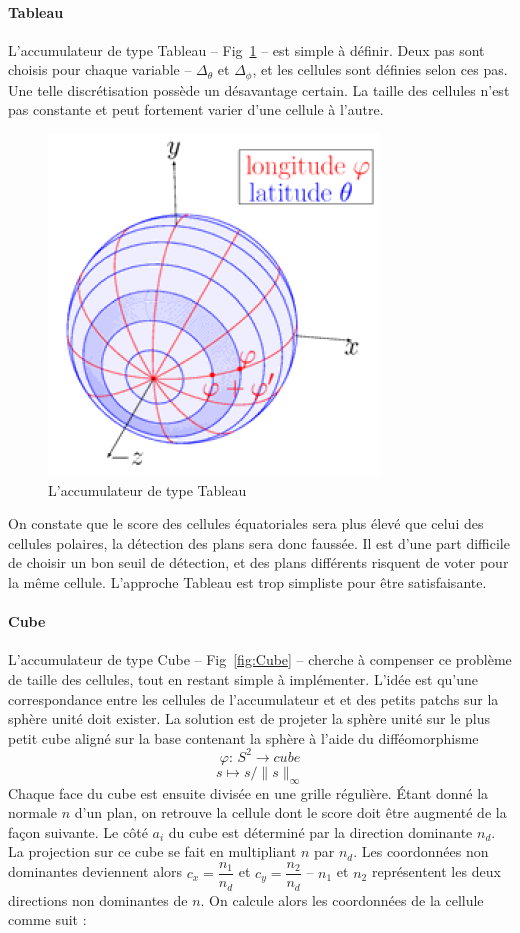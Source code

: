 \documentclass[12pt, twoside]{article}
\begin{document}
\paragraph{Tableau}
L’accumulateur de type Tableau -- Fig~\ref{fig:Array} -- est simple à définir. Deux pas sont choisis pour chaque variable -- $\Delta_{\theta}$ et $\Delta_{\phi}$, et les cellules sont définies selon ces pas. Une telle discrétisation possède un désavantage certain. La taille des cellules n’est pas constante et peut fortement varier d’une cellule à l’autre.

\begin{figure}[h]
\centering
\includegraphics[scale=0.65]{Array.png}
\caption{\label{fig:Array} L'accumulateur de type Tableau}
\end{figure}

On constate que le score des cellules équatoriales sera plus élevé que celui des cellules polaires, la détection des plans sera donc faussée. Il est d’une part difficile de choisir un bon seuil de détection, et des plans différents risquent de voter pour la même cellule. L’approche Tableau est trop simpliste pour être satisfaisante.

\paragraph{Cube}
L’accumulateur de type Cube -- Fig~\ref{fig:Cube} -- cherche à compenser ce problème de taille des cellules, tout en restant simple à implémenter. L’idée est qu’une correspondance entre les cellules de l’accumulateur et et des petits patchs sur la sphère unité doit exister. La solution est de projeter la sphère unité sur le plus petit cube aligné sur la base contenant la sphère à l’aide du difféomorphisme
$$\varphi \text{: } S^2 \rightarrow cube$$
$$s \mapsto s/\lVert s\rVert_{\infty}$$
Chaque face du cube est ensuite divisée en une grille régulière. Étant donné la normale $n$ d’un plan, on retrouve la cellule dont le score doit être augmenté de la façon suivante. Le côté $a_i$ du cube est déterminé par la direction dominante $n_d$. La projection sur ce cube se fait en multipliant $n$ par $n_d$. Les coordonnées non dominantes deviennent alors $c_x =
\dfrac{n_1}{n_d}$ et $c_y = \dfrac{n_2}{n_d}$ -- $n_1$ et $n_2$ représentent les deux directions non dominantes de $n$. On calcule alors les coordonnées de la cellule comme suit :
\end{document}

